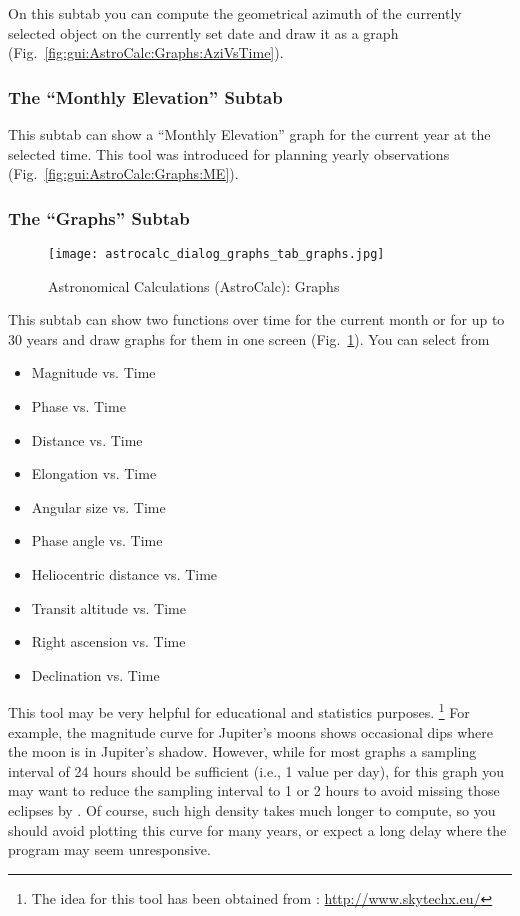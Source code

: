 On this subtab  you can compute the geometrical azimuth of the currently selected object 
on the currently set date and draw it as a graph (Fig.~\ref{fig:gui:AstroCalc:Graphs:AziVsTime}).
    
\subsubsection{The ``Monthly Elevation'' Subtab}
\label{sec:gui:AstroCalc:Graphs:ME}

This subtab  can show a ``Monthly Elevation'' graph for the current year at the selected time.
This tool was introduced for planning yearly observations (Fig.~\ref{fig:gui:AstroCalc:Graphs:ME}).

\subsubsection{The ``Graphs'' Subtab}
\label{sec:gui:AstroCalc:Graphs:Graphs}
    
\begin{figure}[p]
\centering\texttt{[image: astrocalc\_dialog\_graphs\_tab\_graphs.jpg]}
\caption{Astronomical Calculations (AstroCalc): Graphs}
\label{fig:gui:AstroCalc:Graphs:Graphs}
\end{figure}
  
This subtab  can show two functions over time for
the current month or for up to 30 years and draw graphs
for them in one screen (Fig.~\ref{fig:gui:AstroCalc:Graphs:Graphs}).
You can select from
\begin{itemize}
\item Magnitude vs. Time
\item Phase vs. Time
\item Distance vs. Time 
\item Elongation vs. Time 
\item Angular size vs. Time
\item Phase angle vs. Time
\item Heliocentric distance vs. Time
\item Transit altitude vs. Time
\item Right ascension vs. Time
\item Declination vs. Time
\end{itemize}

This tool may be very helpful for educational and statistics purposes.%
	\footnote{The idea for this tool has been obtained from : \url{http://www.skytechx.eu/}}
For example, the magnitude curve for Jupiter's moons shows occasional dips where the moon is in Jupiter's shadow.
However, while for most graphs a sampling interval of 24 hours should be sufficient (i.e., 1 value per day),
for this graph you may want to reduce the sampling interval  to 1 or 2 hours to avoid missing those eclipses by .
Of course, such high density takes much longer to compute, so you should avoid plotting this curve for many years,
or expect a long delay where the program may seem unresponsive.
	

